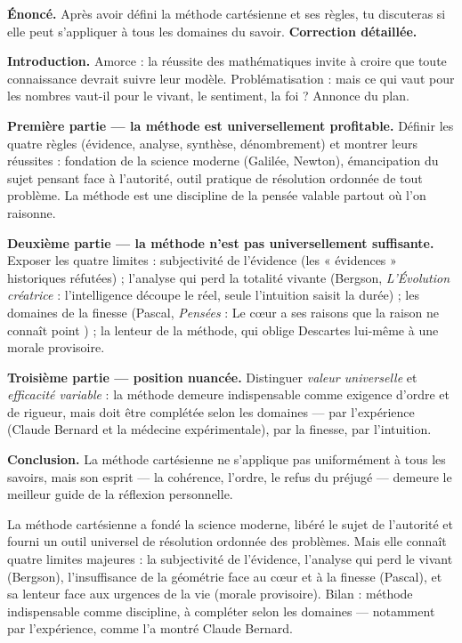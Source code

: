 \documentclass[11pt]{article}
\begin{document}
\begin{exoresolu}
\textbf{Énoncé.} Après avoir défini la méthode cartésienne et ses règles, tu discuteras si elle peut s'appliquer à tous les domaines du savoir.
\tcblower
\textbf{Correction détaillée.}

\textbf{Introduction.} Amorce : la réussite des mathématiques invite à croire que toute connaissance devrait suivre leur modèle. Problématisation : mais ce qui vaut pour les nombres vaut-il pour le vivant, le sentiment, la foi ? Annonce du plan.

\textbf{Première partie — la méthode est universellement profitable.} Définir les quatre règles (évidence, analyse, synthèse, dénombrement) et montrer leurs réussites : fondation de la science moderne (Galilée, Newton), émancipation du sujet pensant face à l'autorité, outil pratique de résolution ordonnée de tout problème. La méthode est une discipline de la pensée valable partout où l'on raisonne.

\textbf{Deuxième partie — la méthode n'est pas universellement suffisante.} Exposer les quatre limites : subjectivité de l'évidence (les « évidences » historiques réfutées) ; l'analyse qui perd la totalité vivante (Bergson, \emph{L'Évolution créatrice} : l'intelligence découpe le réel, seule l'intuition saisit la durée) ; les domaines de la finesse (Pascal, \emph{Pensées} : \guillemotleft Le cœur a ses raisons que la raison ne connaît point \guillemotright) ; la lenteur de la méthode, qui oblige Descartes lui-même à une morale provisoire.

\textbf{Troisième partie — position nuancée.} Distinguer \emph{valeur universelle} et \emph{efficacité variable} : la méthode demeure indispensable comme exigence d'ordre et de rigueur, mais doit être complétée selon les domaines — par l'expérience (Claude Bernard et la médecine expérimentale), par la finesse, par l'intuition.

\textbf{Conclusion.} La méthode cartésienne ne s'applique pas uniformément à tous les savoirs, mais son esprit — la cohérence, l'ordre, le refus du préjugé — demeure le meilleur guide de la réflexion personnelle.
\end{exoresolu}

\begin{aretenir}
La méthode cartésienne a fondé la science moderne, libéré le sujet de l'autorité et fourni un outil universel de résolution ordonnée des problèmes. Mais elle connaît quatre limites majeures : la subjectivité de l'évidence, l'analyse qui perd le vivant (Bergson), l'insuffisance de la géométrie face au cœur et à la finesse (Pascal), et sa lenteur face aux urgences de la vie (morale provisoire). Bilan : méthode indispensable comme discipline, à compléter selon les domaines — notamment par l'expérience, comme l'a montré Claude Bernard.
\end{aretenir}
\end{document}
